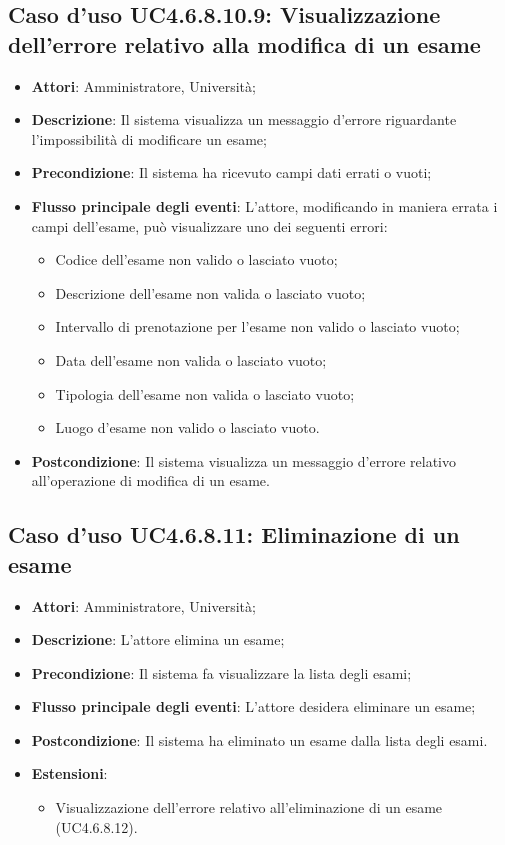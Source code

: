 \subsection{Caso d'uso \texorpdfstring{UC4.6.8.10.9}{UC4.6.8.10.9}: Visualizzazione dell'errore relativo alla modifica di un esame}
\begin{itemize}
	\item \textbf{Attori}: Amministratore, Università;
	\item \textbf{Descrizione}: Il sistema visualizza un messaggio d'errore riguardante l'impossibilità di modificare un esame;
	
	\item \textbf{Precondizione}: Il sistema ha ricevuto campi dati errati o vuoti;
	
	
	\item \textbf{Flusso principale degli eventi}: L'attore, modificando in maniera errata i campi dell'esame, può visualizzare uno dei seguenti errori: \begin{itemize} 
		\item Codice dell’esame non valido o lasciato vuoto; 
		\item Descrizione dell’esame non valida o lasciato vuoto; 
		\item Intervallo di prenotazione per l’esame non valido o lasciato vuoto; 
		\item Data dell’esame non valida o lasciato vuoto; 
		\item Tipologia dell’esame non valida o lasciato vuoto; 
		\item Luogo d’esame non valido o lasciato vuoto.
	\end{itemize}
	\item \textbf{Postcondizione}: Il sistema visualizza un messaggio d'errore relativo all'operazione di modifica di un esame.
	
	
\end{itemize}
\subsection{Caso d'uso \texorpdfstring{UC4.6.8.11}{UC4.6.8.11}: Eliminazione di un esame}
\begin{itemize}
	\item \textbf{Attori}: Amministratore, Università;
	\item \textbf{Descrizione}: L'attore elimina un esame;
	
	\item \textbf{Precondizione}: Il sistema fa visualizzare la lista degli esami;
	
	\item \textbf{Flusso principale degli eventi}: L'attore desidera eliminare un esame;
	
	\item \textbf{Postcondizione}: Il sistema ha eliminato un esame dalla lista degli esami.
	
	\item \textbf{Estensioni}:
	\begin{itemize}
		\item Visualizzazione dell'errore relativo all'eliminazione di un esame (UC4.6.8.12).
	\end{itemize}
\end{itemize}
